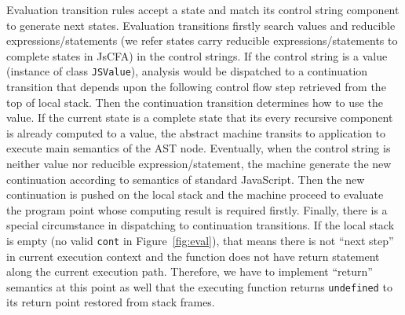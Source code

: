 \documentclass{article}
\begin{document}
Evaluation transition rules accept a state and match its control string component to generate next states. Evaluation transitions firstly search values and reducible expressions/statements (we refer states carry reducible expressions/statements to complete states in JsCFA) in the control strings.
If the control string is a value (instance of class \verb|JSValue|), analysis would be dispatched to a continuation transition that depends upon  the following control flow step retrieved from the top of local stack. Then the continuation transition determines how to use the value.
If the current state is a complete state that its every recursive component is already computed to a value, the abstract machine transits to application to execute main semantics of the AST node. Eventually, when the control string is neither value nor reducible expression/statement, the machine generate the new continuation according to semantics of standard JavaScript. Then the new continuation is pushed on the local stack and the machine proceed to evaluate the program point whose computing result is required firstly.
Finally, there is a special circumstance in dispatching to continuation transitions. If the local stack is empty (no valid \verb|cont| in Figure~\ref{fig:eval}), that means there is not ``next step'' in current execution context and the function does not have return statement along the current execution path. Therefore, we have to implement ``return'' semantics at this point as well that the executing function returns \verb|undefined| to its return point restored from stack frames.
\end{document}
